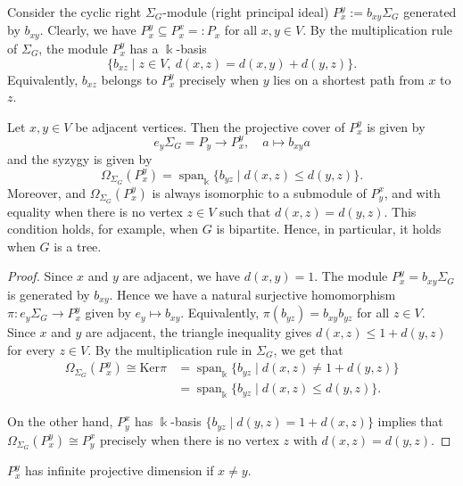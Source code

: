 \documentclass[a4paper,leqno]{amsart}
\begin{document}
Consider the cyclic right $\Sigma_G$-module (right principal ideal) $P_x^y:=b_{xy}\Sigma_G$ generated by $b_{xy}$. 
Clearly, we have $P_x^y\subseteq P_x^x=:P_x$ for all $x,y\in V$.
By the multiplication rule of $\Sigma_G$, the module $P_x^y$ has a $\Bbbk$-basis
$$\{b_{xz}\mid z\in V,\ d(x,z)=d(x,y)+d(y,z)\}.$$
Equivalently, $b_{xz}$ belongs to $P_x^y$ precisely when $y$ lies on a shortest path from $x$ to $z$.

\begin{lem}\label{lem:syzygy}
Let $x,y\in V$ be adjacent vertices. Then the projective cover of $P_x^y$ is given by
$$e_y\Sigma_G=P_y\rightarrow P_x^y,\quad a\mapsto b_{xy}a$$
and the syzygy is given by
$$\Omega_{\Sigma_G}(P_x^y)=\operatorname{span}_{\Bbbk}\{b_{yz}\mid d(x,z)\leq d(y,z)\}.$$
Moreover, and $\Omega_{\Sigma_G}(P_x^y)$ is always isomorphic to a submodule of $P_y^x$, and with equality when  there is no vertex $z\in V$ such that $d(x,z)=d(y,z)$.  This condition holds, for example, when $G$ is bipartite. Hence, in particular, it holds when $G$ is a tree.
\end{lem}

\begin{proof}
Since $x$ and $y$ are adjacent, we have $d(x,y)=1$. The module $P_x^y=b_{xy}\Sigma_G$ is generated by $b_{xy}$. Hence we have a natural surjective homomorphism
$\pi:e_y\Sigma_G\rightarrow P_x^y$ given by $e_y\mapsto b_{xy}$.
Equivalently, $\pi(b_{yz})=b_{xy}b_{yz}$ for all $z\in V$. 
Since $x$ and $y$ are adjacent, the triangle inequality gives $d(x,z)\leq 1+d(y,z)$ for every $z\in V$.
By the multiplication rule in $\Sigma_G$, we get that
\begin{align*}
\Omega_{\Sigma_G}(P_x^y)\cong\mathrm{Ker}\pi&=\operatorname{span}_{\Bbbk}\{b_{yz}\mid d(x,z)\neq 1+d(y,z)\}\\
&=\operatorname{span}_{\Bbbk}\{b_{yz}\mid d(x,z)\leq d(y,z)\}. 
\end{align*}

On the other hand, $P_y^x$ has $\Bbbk$-basis $\{b_{yz}\mid d(y,z)=1+d(x,z)\}$ implies that $\Omega_{\Sigma_G}(P_x^y)\cong P_y^x$ precisely when there is no vertex $z$ with $d(x,z)=d(y,z)$.
\end{proof}


\begin{prop}\label{prop:pdim Pxy}\label{prop:gldim-infity}
    $P_x^y$ has infinite projective dimension if $x\neq y$.
\end{prop}
\end{document}

